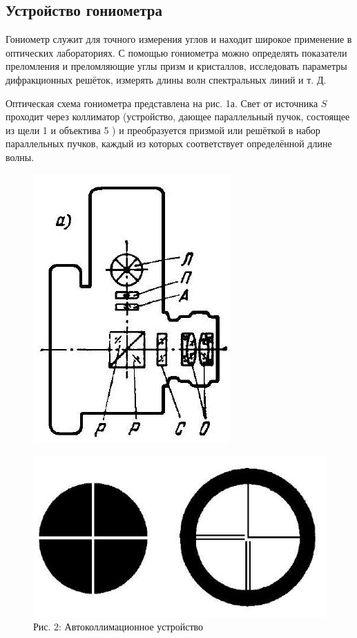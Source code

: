 \documentclass[a4paper,12pt]{article} %
\begin{document}
\subsection{Устройство гониометра}

Гониометр служит для точного измерения углов и находит широкое применение в оптических лабораториях. С помощью гониометра можно определять показатели преломления и преломляющие углы призм и кристаллов, исследовать параметры дифракционных решёток, измерять длины волн спектральных линий и т. Д.

Оптическая схема гониометра представлена на рис. 1а. Свет от источника $S$ проходит через коллиматор (устройство, дающее параллельный пучок, состоящее из щели 1 и объектива 5 ) и преобразуется призмой или решёткой в набор параллельных пучков, каждый из которых соответствует определённой длине волны.

\begin{figure}[H]
    \centering
    \includegraphics[scale=0.4]{2023_04_02_a48ae02e429ba186bcd7g-1(1)}

    \includegraphics[scale=0.4]{2023_04_02_a48ae02e429ba186bcd7g-1}\\
    {Рис. 2: Автоколлимационное устройство}
    \label{fig:my_label}
\end{figure}
\end{document}
